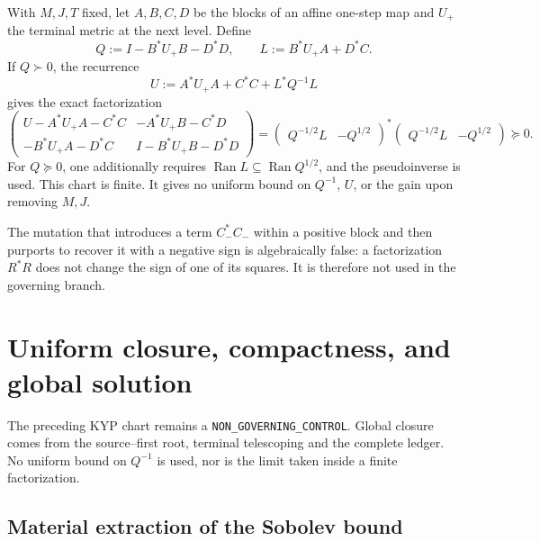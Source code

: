With $M,J,T$ fixed, let $A,B,C,D$ be the blocks of an affine one-step map and $U_+$ the
terminal metric at the next level. Define
\begin{equation}\label{eq:pdf2-ns-kyp-ql}
 Q:=I-B^*U_+B-D^*D,
 \qquad L:=B^*U_+A+D^*C.
\end{equation}
If $Q\succ0$, the recurrence
\begin{equation}\label{eq:pdf2-ns-kyp-u}
 U:=A^*U_+A+C^*C+L^*Q^{-1}L
\end{equation}
gives the exact factorization
\begin{equation}\label{eq:pdf2-ns-kyp-factor}
 \begin{pmatrix}
 U-A^*U_+A-C^*C&-A^*U_+B-C^*D\\
 -B^*U_+A-D^*C&I-B^*U_+B-D^*D
 \end{pmatrix}
 =
 \begin{pmatrix}Q^{-1/2}L&-Q^{1/2}\end{pmatrix}^{*}
 \begin{pmatrix}Q^{-1/2}L&-Q^{1/2}\end{pmatrix}\succeq0.
\end{equation}
For $Q\succeq0$, one additionally requires
$\operatorname{Ran}L\subseteq\operatorname{Ran}Q^{1/2}$, and the
pseudoinverse is used. This chart is finite. It gives no uniform bound on $Q^{-1}$, $U$, or
the gain upon removing $M,J$.

The mutation that introduces a term $C_-^*C_-$ within a positive block and
then purports to recover it with a negative sign is algebraically false: a
factorization $R^*R$ does not change the sign of one of its squares. It is therefore not used
in the governing branch.

\section{Uniform closure, compactness, and global solution}

The preceding KYP chart remains a \texttt{NON\_GOVERNING\_CONTROL}. Global
closure comes from the source--first root, terminal telescoping and the complete
ledger. No uniform bound on $Q^{-1}$ is used, nor is the limit taken inside
a finite factorization.

\subsection{Material extraction of the Sobolev bound}

